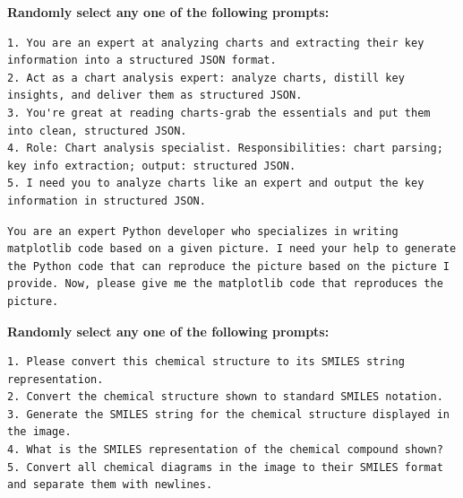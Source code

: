\begin{tcolorbox}[
  colback=gray!5,
  colframe=gray!60,
  title={Prompt for chart2json},
  fonttitle=\bfseries,
  breakable
]
\textbf{Randomly select any one of the following prompts:} \\
\begin{lstlisting}[style=promptlisting, breakautoindent=false, breakindent=0pt]
1. You are an expert at analyzing charts and extracting their key information into a structured JSON format.
2. Act as a chart analysis expert: analyze charts, distill key insights, and deliver them as structured JSON.
3. You're great at reading charts-grab the essentials and put them into clean, structured JSON.
4. Role: Chart analysis specialist. Responsibilities: chart parsing; key info extraction; output: structured JSON.
5. I need you to analyze charts like an expert and output the key information in structured JSON.
\end{lstlisting}
\end{tcolorbox}

\begin{tcolorbox}[
  colback=gray!5,
  colframe=gray!60,
  title={Prompt for chart2code},
  fonttitle=\bfseries,
  breakable
]
\begin{lstlisting}[style=promptlisting, breakautoindent=false, breakindent=0pt]
You are an expert Python developer who specializes in writing matplotlib code based on a given picture. I need your help to generate the Python code that can reproduce the picture based on the picture I provide. Now, please give me the matplotlib code that reproduces the picture.
\end{lstlisting}
\end{tcolorbox}

\begin{tcolorbox}[
  colback=gray!5,
  colframe=gray!60,
  title={Prompt for chem2smiles},
  fonttitle=\bfseries,
  breakable
]
\textbf{Randomly select any one of the following prompts:} \\
\begin{lstlisting}[style=promptlisting, breakautoindent=false, breakindent=0pt]
1. Please convert this chemical structure to its SMILES string representation.
2. Convert the chemical structure shown to standard SMILES notation.
3. Generate the SMILES string for the chemical structure displayed in the image.
4. What is the SMILES representation of the chemical compound shown?
5. Convert all chemical diagrams in the image to their SMILES format and separate them with newlines.
\end{lstlisting}
\end{tcolorbox}

